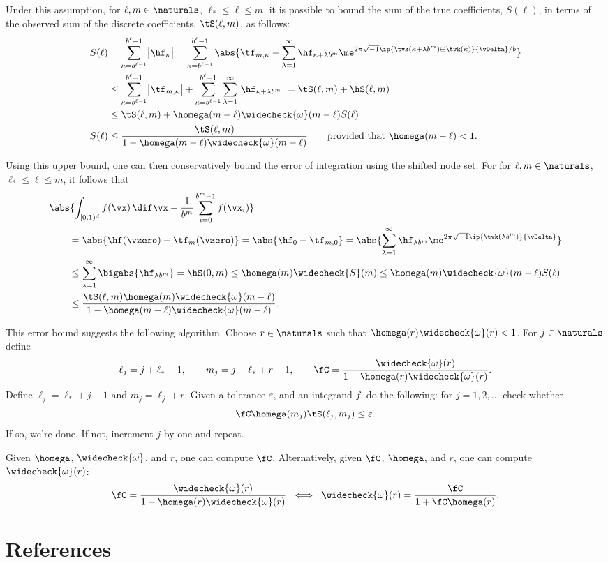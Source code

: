 \documentclass[]{elsarticle}
\newcommand{\fudge}{\fC}
\theoremstyle{definition}
\newcommand{\cube}{[0,1)^d}
\newcommand{\wcS}{\widecheck{S}}
\newcommand{\wcomega}{\widecheck{\omega}}
\begin{document}
Under this assumption, for $\ell, m \in \naturals$, $\ell_* \le \ell \le m$, it is possible to bound the sum of the true coefficients, $S(\ell)$, in terms of the observed sum of the discrete coefficients, $\tS(\ell,m)$, as follows:
\begin{align*}
S(\ell) &= \sum_{\kappa=b^{\ell-1}}^{b^{\ell}-1} \bigl \lvert \hf_{\kappa}\bigr\rvert= \sum_{\kappa=b^{\ell-1}}^{b^{\ell}-1} \abs{\tf_{m,\kappa} - \sum_{\lambda=1}^{\infty} \hf_{\kappa+\lambda b^{m}} \me^{2 \pi \sqrt{-1} \ip{\tvk(\kappa+\lambda b^{m}) \ominus \tvk(\kappa)}{\vDelta}/b}}\\
&\le \sum_{\kappa=b^{\ell-1}}^{b^{\ell}-1} \bigl \lvert \tf_{m,\kappa} \bigr\rvert + \sum_{\kappa=b^{\ell-1}}^{b^{\ell}-1} \sum_{\lambda=1}^{\infty} \bigl \lvert \hf_{\kappa+\lambda b^{m}}\bigr\rvert = \tS(\ell,m) + \hS(\ell,m) \\
&\le \tS(\ell,m) + \homega(m-\ell) \wcomega(m-\ell) S(\ell) \\
S(\ell) & \le \frac{\tS(\ell,m)}{1 - \homega(m-\ell) \wcomega(m-\ell)} \qquad \text{provided that } \homega(m-\ell) < 1.
\end{align*}

Using this upper bound, one can then conservatively bound the error of integration using the shifted node set.  For for $\ell, m \in \naturals$, $\ell_* \le \ell \le m$, it follows that
\begin{align*}
\MoveEqLeft{\abs{\int_{\cube} f(\vx) \, \dif \vx - \frac{1}{b^m} \sum_{i=0}^{b^m-1} f(\vx_i) }}\\
&= \abs{\hf(\vzero) - \tf_m(\vzero)} = \abs{\hf_0 - \tf_{m,0}} = \abs{\sum_{\lambda=1}^{\infty} \hf_{\lambda b^{m}} \me^{2 \pi \sqrt{-1}\ip{\tvk(\lambda b^{m})}{\vDelta}}}\\
&\le \sum_{\lambda=1}^{\infty} \bigabs{\hf_{\lambda b^{m}}}
= \hS(0,m) \le \homega(m) \wcS(m) \le \homega(m) \wcomega(m-\ell) S(\ell) \\
& \le \frac{\tS(\ell,m)\homega(m) \wcomega(m-\ell)}{1 - \homega(m-\ell) \wcomega(m-\ell)}.
\end{align*}

This error bound suggests the following algorithm.  Choose $r \in \naturals$ such that $\homega(r)\wcomega(r)<1$.  For $j \in \naturals$ define
\[
\ell_j=j+\ell_*-1, \qquad  m_j=j+\ell_*+r-1, \qquad  \fudge = \frac{\wcomega(r)}{1 - \homega(r)\wcomega(r)}.
\]
Define $\ell_j=\ell_*+j-1$ and $m_j=\ell_j+r$.  Given a tolerance $\varepsilon$, and an integrand $f$, do the following:  for $j=1, 2, \ldots$ check whether
\[
\fudge \homega(m_j)  \tS(\ell_j,m_j) \le \varepsilon.
\]
If so, we're done.  If not, increment $j$ by one and repeat.

Given $\homega$, $\wcomega$, and $r$, one can compute $\fC$.  Alternatively, given $\fC$, $\homega$, and $r$, one can compute $\wcomega(r)$:
\[
\fudge = \frac{\wcomega(r)}{1 - \homega(r)\wcomega(r)} \ \iff \ \wcomega(r)= \frac{\fC}{1+\fC\homega(r)}.
\]


\section{References}

%
\nocite{Slo85,NiePil09a,DicEtal14a,DicHicLiu07a,Clancy2013,SloJoe94}

\end{document}
